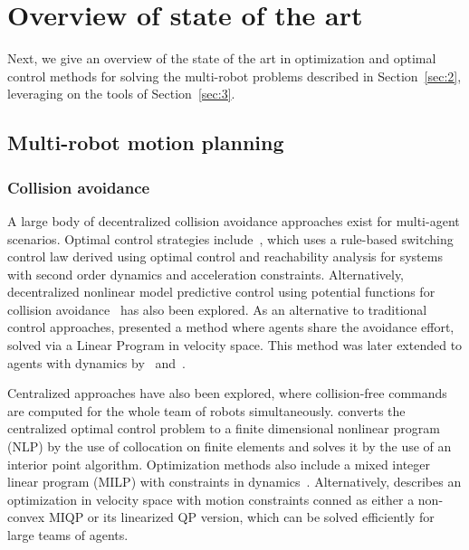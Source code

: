 
\section{Overview of state of the art}\label{sec:4}

Next, we give an overview of the state of the art in optimization and optimal control methods for solving the multi-robot problems described in Section~\ref{sec:2}, leveraging on the tools of Section~\ref{sec:3}.

\subsection{Multi-robot motion planning}

\subsubsection{Collision avoidance}
A large body of decentralized collision avoidance approaches exist for multi-agent scenarios.
Optimal control strategies include~\cite{Hoffmann:2008vl}, which uses a rule-based switching control law derived using optimal control and reachability analysis for systems with second order dynamics and acceleration constraints.
Alternatively, decentralized nonlinear model predictive control using potential functions for collision avoidance~\cite{Shim:2003ih} has also been explored.
As an alternative to traditional control approaches, \cite{vandenberg09} presented a method where agents share the avoidance effort, solved via a Linear Program in velocity space. This method was later extended to agents with dynamics by~\cite{snape09, alonsomora10, AlonsoMora:2014kb} and~\cite{alonsomora2015auro}.

Centralized approaches have also been explored, where collision-free commands are computed for the whole team of robots simultaneously.
\cite{Raghunathan:2004ga} converts the centralized optimal control problem to a finite dimensional nonlinear program (NLP) by the use of collocation on finite elements and solves it by the use of an interior point algorithm.
Optimization methods also include a mixed integer linear program (MILP) with constraints in dynamics~\cite{Kuwata:2007vq}. Alternatively, \cite{alonsomora13icra} describes an optimization in velocity space with motion constraints conned as either a non-convex MIQP or its linearized QP version, which can be solved efficiently for large teams of agents.

